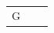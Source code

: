 {\begin{tabular}[t]{|l|l|l|}
     \tabularnewline\cline{1-1}\cline{2-2}\cline{3-3}
    
    
        G &
    
    
         &
    
    
     \tabularnewline\cline{1-1}\cline{2-2}\cline{3-3}
    \end{tabular}} %
        \addtolength{\mytableboxheight}{\mytableboxdepth}
        \addtocounter{footnote}{-0}
        
